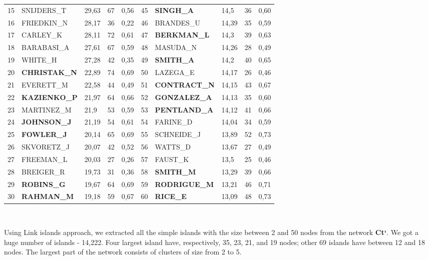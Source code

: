 \documentclass[11pt]{article} %
\begin{document}
\begin{table}
\begin{tabular}{c|l|p{1cm}|p{1cm}|p{1.5cm}||c|l|p{1cm}|p{1cm}|p{1.5cm}|}
15& 	SNIJDERS\_T& 	29,63& 	67& 	0,56& 	45& 	\textbf{SINGH\_A}& 	14,5& 	36& 	0,60\\
16& 	FRIEDKIN\_N& 	28,17& 	36& 	0,22& 	46& 	BRANDES\_U& 	14,39& 	35& 	0,59\\
17& 	CARLEY\_K& 	28,11& 	72& 	0,61& 	47& 	\textbf{BERKMAN\_L}& 	14,3& 	39& 	0,63\\
18& 	BARABASI\_A& 	27,61& 	67& 	0,59& 	48& 	MASUDA\_N& 	14,26& 	28& 	0,49\\
19& 	WHITE\_H& 	27,28& 	42& 	0,35& 	49& 	\textbf{SMITH\_A}& 	14,2& 	40& 	0,65\\
20& 	\textbf{CHRISTAK\_N}& 	22,89& 	74& 	0,69& 	50& 	LAZEGA\_E& 	14,17& 	26& 	0,46\\
21& 	EVERETT\_M& 	22,58& 	44& 	0,49& 	51& 	\textbf{CONTRACT\_N}& 	14,15& 	43& 	0,67\\
22& 	\textbf{KAZIENKO\_P}& 	21,97& 	64& 	0,66& 	52& 	\textbf{GONZALEZ\_A}& 	14,13& 	35& 	0,60\\
23& 	MARTINEZ\_M& 	21,9& 	53& 	0,59& 	53& 	\textbf{PENTLAND\_A}& 	14,12& 	41& 	0,66\\
24& 	\textbf{JOHNSON\_J}& 	21,19& 	54& 	0,61& 	54& 	FARINE\_D& 	14,04& 	34& 	0,59\\
25& 	\textbf{FOWLER\_J}& 	20,14& 	65& 	0,69& 	55& 	SCHNEIDE\_J& 	13,89& 	52& 	0,73\\
26& 	SKVORETZ\_J& 	20,07& 	42& 	0,52& 	56& 	WATTS\_D& 	13,67& 	27& 	0,49\\
27& 	FREEMAN\_L& 	20,03& 	27& 	0,26& 	57& 	FAUST\_K& 	13,5& 	25& 	0,46\\
28& 	BREIGER\_R& 	19,73& 	31& 	0,36& 	58& 	\textbf{SMITH\_M}& 	13,29& 	39& 	0,66\\
29& 	\textbf{ROBINS\_G}& 	19,67& 	64& 	0,69& 	59& 	\textbf{RODRIGUE\_M}& 	13,21& 	46& 	0,71\\
30& 	\textbf{RAHMAN\_M}& 	19,18& 	59& 	0,67& 	60& 	\textbf{RICE\_E}& 	13,09& 	48& 	0,73\\
\end{tabular}\\
\end{table}

Using Link islands approach, we extracted all the simple islands with the size between 2 and 50 nodes from the network \textbf{Ct`}. We got a huge number of islands - 14,222. Four largest island have, respectively, 35, 23, 21, and 19 nodes; other 69 islands have between 12 and 18 nodes. The largest part of the network consists of clusters of size from 2 to 5.  \medskip
\end{document}
